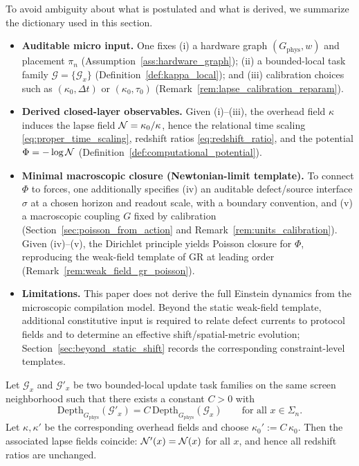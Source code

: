 \begin{remark}
\label{rem:micro_to_macro_map}
To avoid ambiguity about what is postulated and what is derived, we summarize the dictionary used in this section.
\begin{itemize}
\item \textbf{Auditable micro input.}
One fixes (i) a hardware graph $(G_{\mathrm{phys}},w)$ and placement $\pi_n$ (Assumption~\ref{ass:hardware_graph});
(ii) a bounded-local task family $\mathcal{G}=\{\mathcal{G}_x\}$ (Definition~\ref{def:kappa_local});
and (iii) calibration choices such as $(\kappa_0,\Delta t)$ or $(\kappa_0,\tau_0)$ (Remark~\ref{rem:lapse_calibration_reparam}).
\item \textbf{Derived closed-layer observables.}
Given (i)--(iii), the overhead field $\kappa$ induces the lapse field $\mathcal{N}=\kappa_0/\kappa$, hence the relational time scaling \eqref{eq:proper_time_scaling}, redshift ratios \eqref{eq:redshift_ratio}, and the potential $\Phi=-\log\mathcal{N}$ (Definition~\ref{def:computational_potential}).
\item \textbf{Minimal macroscopic closure (Newtonian-limit template).}
To connect $\Phi$ to forces, one additionally specifies (iv) an auditable defect/source interface $\sigma$ at a chosen horizon and readout scale, with a boundary convention, and (v) a macroscopic coupling $G$ fixed by calibration (Section~\ref{sec:poisson_from_action} and Remark~\ref{rem:units_calibration}).
Given (iv)--(v), the Dirichlet principle yields Poisson closure for $\Phi$, reproducing the weak-field template of GR at leading order (Remark~\ref{rem:weak_field_gr_poisson}).
\item \textbf{Limitations.}
This paper does not derive the full Einstein dynamics from the microscopic compilation model.
Beyond the static weak-field template, additional constitutive input is required to relate defect currents to protocol fields and to determine an effective shift/spatial-metric evolution; Section~\ref{sec:beyond_static_shift} records the corresponding constraint-level templates.
\end{itemize}
\end{remark}

\begin{proposition}
\label{prop:clock_task_equivalence}
Let $\mathcal{G}_x$ and $\mathcal{G}'_x$ be two bounded-local update task families on the same screen neighborhood such that there exists a constant $C>0$ with
\[
\mathrm{Depth}_{G_{\mathrm{phys}}}(\mathcal{G}'_x)=C\,\mathrm{Depth}_{G_{\mathrm{phys}}}(\mathcal{G}_x)
\qquad \text{for all }x\in\Sigma_n.
\]
Let $\kappa,\kappa'$ be the corresponding overhead fields and choose $\kappa_0' := C\,\kappa_0$.
Then the associated lapse fields coincide: $\mathcal{N}'(x)=\mathcal{N}(x)$ for all $x$, and hence all redshift ratios are unchanged.
\end{proposition}

